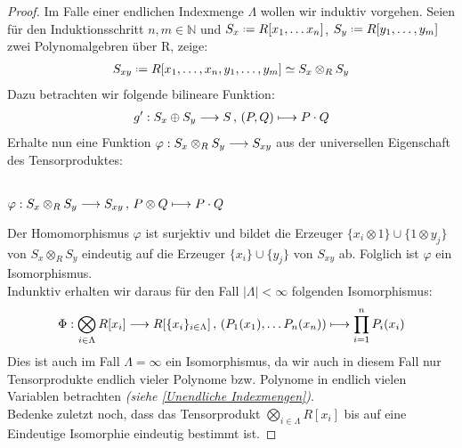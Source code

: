 \documentclass[10pt,a4paper]{report}
\newcommand{\functionfront}[3]{\nolinebreak{#1:#2 \longrightarrow #3}}
\newcommand{\function}[5]{\nolinebreak{#1:#2 \longrightarrow #3 \, , \, #4 \longmapsto #5}}
\newcommand{\Tensor}[3]{#1 \otimes_{#2} #3}
\newcommand{\tensor}[3]{#1 \otimes #3}
\newcommand*{\defeq}{\mathrel{\vcenter{\baselineskip0.5ex \lineskiplimit0pt
                     \hbox{\scriptsize.}\hbox{\scriptsize.}}}%
                     =}
\begin{document}
\begin{proof}
Im Falle einer endlichen Indexmenge $\Lambda$ wollen wir induktiv vorgehen. Seien für den Induktionsschritt $n,m \in \mathbb{N}$ und $\nolinebreak{S_x \defeq R[x_1, \dots x_n]}$, $\nolinebreak{S_y \defeq R[y_1, \dots , y_m]}$ zwei Polynomalgebren über R, zeige:
\begin{gather*}
S_{xy} \defeq R[x_1, \dots , x_n, y_1 , \dots , y_m] \simeq \Tensor{S_x}{R}{S_y}
\end{gather*}
Dazu betrachten wir folgende bilineare Funktion:
\begin{gather*}
\function{g'}{S_x \oplus S_y}{S}{(P,Q)}{P \cdot Q}
\end{gather*}
Erhalte nun eine Funktion $\functionfront{\varphi}{\Tensor{S_x}{R}{S_y}}{S_{xy}}$ aus der universellen Eigenschaft des Tensorproduktes:
\begin{center}
\ \\
$\function{\varphi}{\Tensor{S_x}{R}{S_y}}{S_{xy}}{\tensor{P}{R}{Q}}{P \cdot Q}$
\end{center}
Der Homomorphismus $\varphi$ ist surjektiv und bildet die Erzeuger $\lbrace \tensor{x_i}{R}{1} \rbrace \cup \lbrace \tensor{1}{R}{y_j} \rbrace$ von $\Tensor{S_x}{R}{S_y}$ eindeutig auf die Erzeuger $\lbrace x_i \rbrace \cup \lbrace y_j \rbrace$ von $S_{xy}$ ab. Folglich ist $\varphi$ ein Isomorphismus.\\
Indunktiv erhalten wir daraus für den Fall $\vert \Lambda \vert < \infty$ folgenden Isomorphismus:
\begin{gather*}
\function{\Phi}{\bigotimes_{i \in \Lambda} R[x_i]}{R[\lbrace x_i \rbrace_{i \in \Lambda} ]}{(P_1(x_1), \dots P_n(x_n))}{\prod_{i=1}^{n} P_i(x_i)}
\end{gather*}
Dies ist auch im Fall $\Lambda = \infty$ ein Isomorphismus, da wir auch in diesem Fall nur Tensorprodukte endlich vieler Polynome bzw. Polynome in endlich vielen Variablen betrachten \textit{(siehe \cref{Unendliche Indexmengen})}.\\
Bedenke zuletzt noch, dass das Tensorprodukt $\bigotimes_{i \in \Lambda} R[x_i]$ bis auf eine Eindeutige Isomorphie eindeutig bestimmt ist.
\end{proof}
\end{document}
